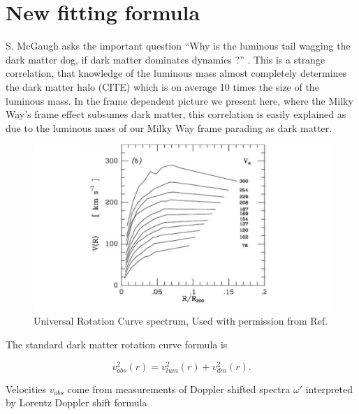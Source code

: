 \documentclass[reprint,%
 amsmath,amssymb,
 aps,
]{revtex4-1}
\begin{document}
   
 
   
 
  
 
\section{New  fitting formula  \label{sec:dos}}
 S. McGaugh asks the important question  ``Why is the luminous tail wagging the dark matter dog,  if dark matter dominates dynamics ?'' \cite{1999McGaugh}.
This is a strange correlation,    that  knowledge of the  luminous mass almost completely determines the    dark matter halo (CITE) which is on average 10 times the size of the luminous mass.  In the frame dependent picture we present here, where the Milky Way's frame effect subsumes dark matter, this correlation is easily explained as due to the luminous mass of our Milky Way frame parading as dark matter. 
  


 
 \begin{figure}[h!]
     \centering
     \includegraphics[width=\linewidth]{URC}
     \caption{Universal Rotation Curve spectrum, Used with permission from Ref.\citep{salucci}}
     \label{fig:URC}
\end{figure}
 
\newpage

 
 The standard dark matter rotation curve formula is

 \begin{equation}
v_{obs}^2 (r)=  v^2_{lum}(r) +  v^2_{dm}(r).  
\label{eq:zonte1}
\end{equation} 



Velocities  $v_{obs}$ come  from   
measurements of  Doppler shifted spectra $\omega'$      interpreted  by  Lorentz   Doppler shift formula 
 
\end{document}
